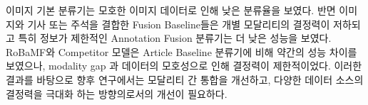 \documentclass{article}
\begin{document}
이미지 기본 분류기는 모호한 이미지 데이터로 인해 낮은 분류율을 보였다. 반면 이미지와 기사 또는 주석을 결합한 Fusion Baseline들은 개별 모달리티의 결정력이 저하되고 특히 정보가 제한적인 Annotation Fusion 분류기는 더 낮은 성능을 보였다. RoBaMF와 Competitor 모델은  Article Baseline 분류기에 비해 약간의 성능 차이를 보였으나, modality gap 과 데이터의 모호성으로 인해 결정력이 제한적이었다. 이러한 결과를 바탕으로 향후 연구에서는 모달리티 간 통합을 개선하고, 다양한 데이터 소스의 결정력을 극대화 하는 방향의로서의 개선이 필요하다.











\end{document}
